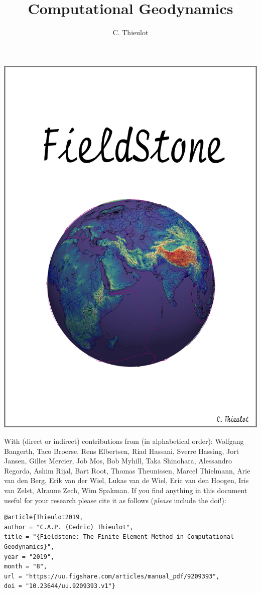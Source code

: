 \documentclass[a4paper]{article}
\title{Computational Geodynamics}
\author{C. Thieulot}
\numberwithin{equation}{section}
\begin{document}
\thispagestyle{empty}
\includegraphics[width=0.9\linewidth]{images/frontpage/frontpage.png}

{\scriptsize With (direct or indirect) contributions from (in alphabetical order): 
Wolfgang Bangerth, 
Taco Broerse,
Rens Elbertsen,
Riad Hassani,
Sverre Hassing,
Jort Jansen,
Gilles Mercier,
Job Mos, 
Bob Myhill,
Taka Shinohara, 
Alessandro Regorda,
Ashim Rijal,
Bart Root,
Thomas Theunissen,
Marcel Thielmann,
Arie van den Berg,
Erik van der Wiel, 
Lukas van de Wiel, 
Eric van den Hoogen, 
Iris van Zelst,
Alraune Zech, 
Wim Spakman.}
\newpage
If you find anything in this document useful for your research please cite it 
as follows ({\it please} include the doi!):

\begin{verbatim}
@article{Thieulot2019,
author = "C.A.P. (Cedric) Thieulot",
title = "{Fieldstone: The Finite Element Method in Computational Geodynamics}",
year = "2019",
month = "8",
url = "https://uu.figshare.com/articles/manual_pdf/9209393",
doi = "10.23644/uu.9209393.v1"}
\end{verbatim}
\end{document}
